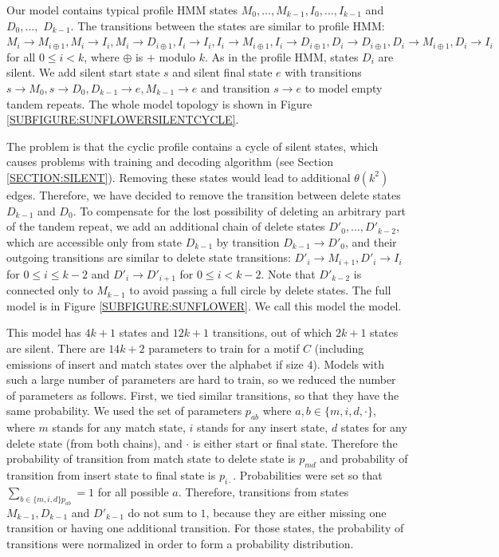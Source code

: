 Our model contains typical profile HMM states $M_0,\dots, M_{k-1}, I_{0},
\dots, I_{k-1}$ and $D_{0}, \dots,$ $D_{k-1}$. The transitions between the states
are similar to profile HMM:  $M_{i}\to M_{i\oplus 1}, M_i\to I_i, M_i\to
D_{i\oplus 1}, I_i\to I_i, I_i\to M_{i\oplus 1}, I_i\to D_{i\oplus 1}, D_{i}\to
D_{i \oplus 1}, D_{i}\to M_{i\oplus 1}, D_{i}\to I_i$ for all $0\leq i < k$,
where $\oplus$ is $+$ modulo $k$. As in the profile HMM, states $D_i$ are
silent. We add silent start state $s$ and silent final state $e$ with
transitions $s\to M_0, s\to D_0, D_{k-1}\to e, M_{k-1}\to e$ and transition
$s\to e$ to model empty tandem repeats. The whole model topology is shown in
Figure \ref{SUBFIGURE:SUNFLOWERSILENTCYCLE}.

The problem is that the cyclic profile contains a cycle of silent states, which
causes problems with training and decoding algorithm (see Section
\ref{SECTION:SILENT}). Removing these states would lead to additional
$\theta(k^2)$ edges. Therefore, we have decided to remove the transition
between delete states $D_{k-1}$ and $D_0$. To compensate for the lost
possibility of deleting an arbitrary part of the tandem repeat, we add an
additional chain of delete states $D'_0, \dots, D'_{k-2}$, which are accessible
only from state $D_{k-1}$ by transition $D_{k-1}\to D'_0$, and their outgoing
transitions are similar to delete state transitions: $D'_{i}\to M_{i+1},
D'_{i}\to I_i$ for $0\leq i\leq k-2$ and $D'_{i} \to D'_{i+1}$ for $0\leq i <
k-2$. Note that $D'_{k-2}$ is connected only to $M_{k-1}$ to avoid passing a
 full circle by delete states. The full model is in Figure
\ref{SUBFIGURE:SUNFLOWER}. We call this model the  model.

This model has $4k+1$ states and $12k+1$ transitions, out of which $2k+1$
states are silent. There are $14k+2$ parameters to train for a motif $C$
(including emissions of insert and match states over the alphabet if size $4$).
Models with such a large number of parameters are hard to train, so we reduced
the number of parameters as follows. First, we tied similar transitions, so
that they have the same probability.  We used the set of parameters $p_{ab}$
where $a,b\in \{m, i, d, \cdot\}$, where $m$ stands for any match state, $i$
stands for any insert state, $d$ states for any delete state (from both
chains), and $\cdot$ is either start or final state. Therefore the probability
of transition from match state to delete state is $p_{md}$ and probability of
transition from insert state to final state is $p_{i\cdot}$.  Probabilities
were set so that $\sum_{b\in\{m,i,d\} p_{ab}}=1$ for all possible $a$.
Therefore, transitions from states $M_{k-1}, D_{k-1}$ and $D'_{k-1}$ do not sum
to $1$, because they are either missing one transition or having one additional
transition. For those states, the probability of transitions were normalized in
order to form a probability distribution. 

